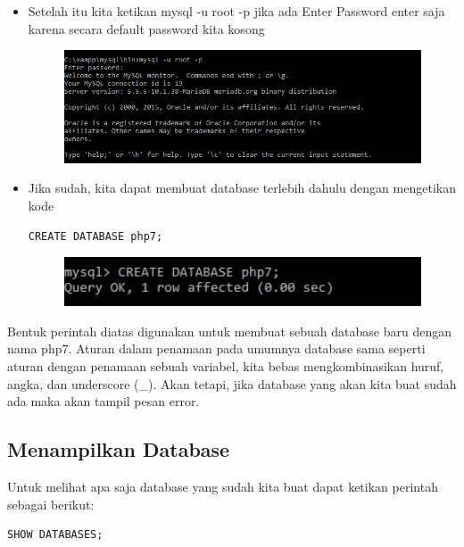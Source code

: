 \begin{itemize}
\item Setelah itu kita ketikan mysql -u root -p jika ada Enter Password enter saja karena secara default password kita kosong

\begin{figure}[ht]
\centerline{\includegraphics[width=1\textwidth]
{figures/cd5}}
\caption{}
\label{cd5}
\end{figure}

\item Jika sudah, kita dapat membuat database terlebih dahulu dengan mengetikan kode

\begin{lstlisting}
CREATE DATABASE php7;
\end{lstlisting}

\begin{figure}[ht]
\centerline{\includegraphics[width=1\textwidth]
{figures/cd6}}
\caption{}
\label{cd6}
\end{figure}

\end{itemize}

Bentuk perintah diatas digunakan untuk membuat sebuah database baru dengan nama php7. Aturan dalam penamaan pada umumnya database sama seperti aturan dengan penamaan sebuah variabel, kita bebas mengkombinasikan huruf, angka, dan underscore (\_). Akan tetapi, jika database yang akan kita buat sudah ada maka akan tampil pesan error.

\subsection{Menampilkan Database}
Untuk melihat apa saja database yang sudah kita buat dapat ketikan perintah sebagai berikut:
\begin{lstlisting}
SHOW DATABASES;
\end{lstlisting}

